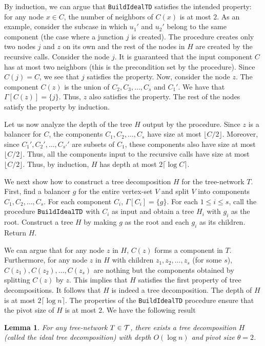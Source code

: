 \documentclass[11pt]{article}
\newtheorem{lemma}[theorem]{\bf Lemma}
\newcommand{\calT} {{\cal T}}
\newcommand{\BuildITD} {{\tt BuildIdealTD}}
\newcommand{\floor}[1] {\lfloor #1 \rfloor}
\begin{document}
By induction, we can argue that {\BuildITD} satisfies the intended property:
for any node $x\in C$, the number of neighbors of $C(x)$ is at most $2$.
As an example, consider the subcase in which $u_1'$ and $u_2'$ belong to the same component 
(the case where a junction $j$ is created). The procedure creates only two nodes $j$ and $z$ on its own
and the rest of the nodes in $H$ are created by the recursive calls. 
Consider the node $j$.
It is guaranteed that the input component $C$ has at most two neighbors (this is the precondition
set by the procedure). Since $C(j)=C$, we see that $j$ satisfies the property.
Now, consider the node $z$. The component $C(z)$ is the union 
of $C_2, C_3,\ldots, C_s$ and $C_1'$. We have that $\Gamma[C(z)]=\{j\}$.
Thus, $z$ also satisfies the property. The rest of the nodes satisfy the property by induction.

Let us now analyze the depth of the tree $H$ output by the procedure.
Since $z$ is a balancer for $C$, the components $C_1, C_2, \ldots, C_s$ have size at most $\floor{C/2}$.
Moreover, since $C_1', C_2',\ldots, C_{s'}'$ are subsets of $C_1$,
these components also have size at most $\floor{C/2}$.
Thus, all the components input to the recursive calls have size at most $\floor{C/2}$. 
Thus, by induction, $H$ has depth at most $2\lceil \log C\rceil$.

We next show how to construct a tree decomposition $H$ for the tree-network $T$.
First, find a balancer $g$ for the entire vertex-set $V$ and split $V$ into components
$C_1, C_2, \ldots, C_s$. For each component $C_i$, $\Gamma[C_i]=\{g\}$.
For each $1\leq i\leq s$, call the procedure $\BuildITD$
with $C_i$ as input and obtain a tree $H_i$ with $g_i$ as the root.
Construct a tree $H$ by making $g$ as the root and each $g_i$ as its children.
Return $H$.

We can argue that for any node $z$ in $H$, $C(z)$ forms a component in $T$.
Furthermore, for any node $z$ in $H$ with children $z_1, z_2, \ldots, z_s$ (for some $s$),
$C(z_1), C(z_2), \ldots, C(z_s)$ are nothing but the components obtained by splitting $C(z)$ by $z$.
This implies that $H$ satisfies the first property of tree decompositions.
It follows that $H$ is indeed a tree decomposition.
The depth of $H$ is at most $2\lceil \log n\rceil$. The properties of the {\BuildITD} procedure
ensure that the pivot size of $H$ is at most $2$. We have the following result

\begin{lemma}
\label{lem:BBB}
For any tree-network $T\in \calT$, there exists a tree decomposition $H$ (called the ideal tree decomposition)
with depth $O(\log n)$ and pivot size $\theta=2$.
\end{lemma}
\end{document}
